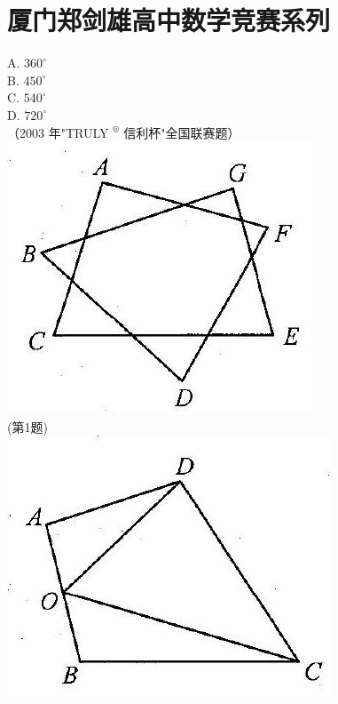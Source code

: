 \documentclass[10pt]{article}
\begin{document}
\section*{厦门郑剑雄高中数学竞赛系列}
A. $360^{\circ}$\\
B. $450^{\circ}$\\
C. $540^{\circ}$\\
D. $720^{\circ}$\\
（2003 年"TRULY ${ }^{\circledR}$ 信利杯"全国联赛题）\\
\includegraphics[max width=\textwidth, center]{2024_10_30_2c8f45efd4a519b08e1ag-108(1)}\\
(第1题)\\
\includegraphics[max width=\textwidth, center]{2024_10_30_2c8f45efd4a519b08e1ag-108}\\
\end{document}
